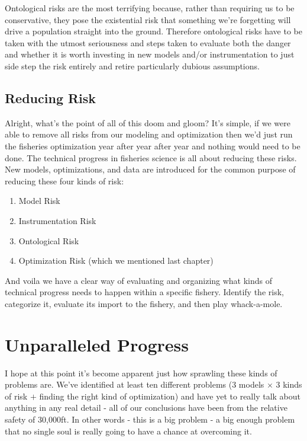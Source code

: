 \documentclass[11pt,a5paper]{book}
\begin{document}
Ontological risks are the most terrifying because, rather than requiring us to be conservative, they pose the existential risk that something we're forgetting will drive a population straight into the ground. Therefore ontological risks have to be taken with the utmost seriousness and steps taken to evaluate both the danger and whether it is worth investing in new models and/or instrumentation to just side step the risk entirely and retire particularly dubious assumptions. 

\section{Reducing Risk}
Alright, what's the point of all of this doom and gloom? It's simple, if we were able to remove all risks from our modeling and optimization then we'd just run the fisheries optimization year after year after year and nothing would need to be done. The technical progress in fisheries science is all about reducing these risks. New models, optimizations, and data are introduced for the common purpose of reducing these four kinds of risk:

\begin{enumerate}
\item Model Risk
\item Instrumentation Risk
\item Ontological Risk
\item Optimization Risk (which we mentioned last chapter)
\end{enumerate}

And voila we have a clear way of evaluating and organizing what kinds of technical progress needs to happen within a specific fishery. Identify the risk, categorize it, evaluate its import to the fishery, and then play whack-a-mole. 
\newpage

\chapter{Unparalleled Progress}

I hope at this point it's become apparent just how sprawling these kinds of problems are. We've identified at least ten different problems (3 models $\times$ 3 kinds of risk $+$ finding the right kind of optimization) and have yet to really talk about anything in any real detail - all of our conclusions have been from the relative safety of 30,000ft. In other words - this is a big problem - a big enough problem that no single soul is really going to have a chance at overcoming it. 
\newline
\end{document}
